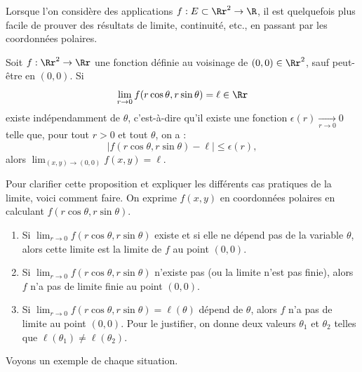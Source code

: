\documentclass[11pt, class=report,crop=false]{standalone}
\begin{document}
Lorsque l'on considère des applications $f: E \subset \Rr^2 \rightarrow \R$, il est quelquefois plus facile de prouver des résultats de limite, continuité, etc., en passant par les coordonnées polaires.


\begin{proposition}
\label{prop:limrtheta}
Soit $f:\Rr^2\to \Rr$ une fonction définie au voisinage de $(0,0)\in \Rr^2$, sauf peut-être en $(0,0)$. Si
$$\lim _{r\to 0}f(r\cos \theta ,r\sin \theta )=\ell \in \Rr$$
existe indépendamment de $\theta$, c'est-à-dire
qu'il existe une fonction $\epsilon(r)\underset{r\to0}{\longrightarrow}0$ telle que, pour tout $r>0$ et tout $\theta$, on a :
$$\big| f(r\cos \theta ,r\sin \theta ) - \ell \big| \le \epsilon(r),$$
alors $\displaystyle \lim _{(x,y)\to (0,0)}f(x,y)=\ell$.
\end{proposition}


Pour clarifier cette proposition et expliquer les différents cas pratiques de la limite, voici comment faire. On exprime $f(x,y)$ en coordonnées polaires en calculant $f(r\cos\theta,r\sin\theta)$.
\begin{enumerate}
  \item Si $\lim_{r\to0} f(r\cos\theta,r\sin\theta)$ existe et si elle ne dépend pas de la variable $\theta$, alors cette limite est la limite de $f$ au point $(0,0)$.
  
  \item Si $\lim_{r\to0} f(r\cos\theta,r\sin\theta)$ n'existe pas (ou la limite n'est pas finie), alors $f$ n'a pas de limite finie au point $(0,0)$.
  
  \item Si $\lim_{r\to0} f(r\cos\theta,r\sin\theta) = \ell(\theta)$ dépend de $\theta$, alors $f$ n'a pas de limite au  point $(0,0)$. Pour le justifier, on donne deux valeurs $\theta_1$ et $\theta_2$ telles que $\ell(\theta_1) \neq \ell(\theta_2)$.
  
\end{enumerate}


Voyons un exemple de chaque situation.
\end{document}
